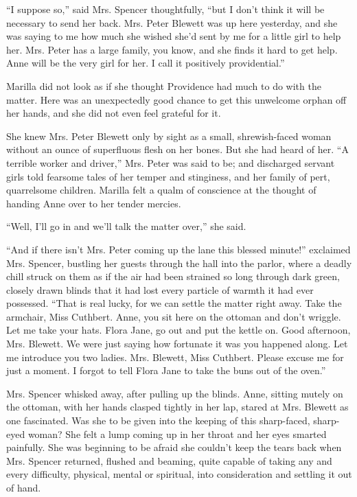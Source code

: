 \documentclass[a4paper]{article}
\begin{document}
``I suppose so,'' said Mrs. Spencer thoughtfully, ``but I don't think it will be necessary to send her back. Mrs. Peter Blewett was up here yesterday, and she was saying to me how much she wished she'd sent by me for a little girl to help her. Mrs. Peter has a large family, you know, and she finds it hard to get help. Anne will be the very girl for her. I call it positively providential.''

Marilla did not look as if she thought Providence had much to do with the matter. Here was an unexpectedly good chance to get this unwelcome orphan off her hands, and she did not even feel grateful for it.

She knew Mrs. Peter Blewett only by sight as a small, shrewish-faced woman without an ounce of superfluous flesh on her bones. But she had heard of her. ``A terrible worker and driver,'' Mrs. Peter was said to be; and discharged servant girls told fearsome tales of her temper and stinginess, and her family of pert, quarrelsome children. Marilla felt a qualm of conscience at the thought of handing Anne over to her tender mercies.

``Well, I'll go in and we'll talk the matter over,'' she said.

``And if there isn't Mrs. Peter coming up the lane this blessed minute!'' exclaimed Mrs. Spencer, bustling her guests through the hall into the parlor, where a deadly chill struck on them as if the air had been strained so long through dark green, closely drawn blinds that it had lost every particle of warmth it had ever possessed. ``That is real lucky, for we can settle the matter right away. Take the armchair, Miss Cuthbert. Anne, you sit here on the ottoman and don't wriggle. Let me take your hats. Flora Jane, go out and put the kettle on. Good afternoon, Mrs. Blewett. We were just saying how fortunate it was you happened along. Let me introduce you two ladies. Mrs. Blewett, Miss Cuthbert. Please excuse me for just a moment. I forgot to tell Flora Jane to take the buns out of the oven.''

Mrs. Spencer whisked away, after pulling up the blinds. Anne, sitting mutely on the ottoman, with her hands clasped tightly in her lap, stared at Mrs. Blewett as one fascinated. Was she to be given into the keeping of this sharp-faced, sharp-eyed woman? She felt a lump coming up in her throat and her eyes smarted painfully. She was beginning to be afraid she couldn't keep the tears back when Mrs. Spencer returned, flushed and beaming, quite capable of taking any and every difficulty, physical, mental or spiritual, into consideration and settling it out of hand.
\end{document}

